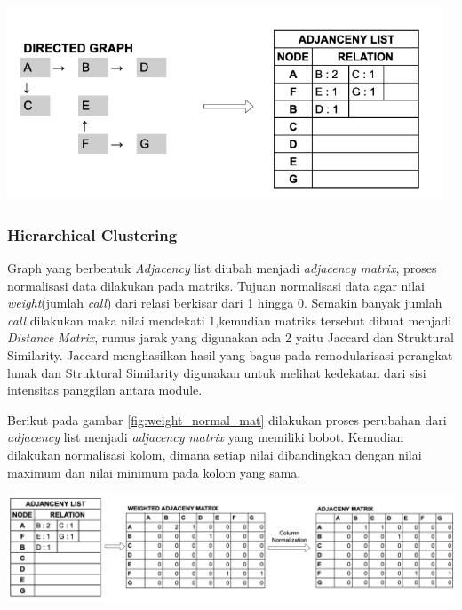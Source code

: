 \begin{center}
	\includegraphics[width=13cm]{img/bab_3/dg_al.png}
	\label{fig:dg_al}
\end{center}

\subsubsection{Hierarchical Clustering}
Graph yang berbentuk \textit{Adjacency} list diubah menjadi \textit{adjacency} \textit{matrix}, proses normalisasi data dilakukan pada matriks. Tujuan normalisasi data agar nilai \textit{weight}(jumlah \textit{call}) dari relasi berkisar dari 1 hingga 0. Semakin banyak jumlah \textit{call} dilakukan maka nilai mendekati 1,kemudian matriks tersebut dibuat menjadi \textit{Distance} \textit{Matrix}, rumus jarak yang digunakan ada 2 yaitu Jaccard dan Struktural Similarity. Jaccard menghasilkan hasil yang bagus pada remodularisasi perangkat lunak dan Struktural Similarity digunakan untuk melihat kedekatan dari sisi intensitas panggilan antara module.

Berikut pada gambar \ref{fig:weight_normal_mat} dilakukan proses perubahan dari \textit{adjacency} list menjadi \textit{adjacency} \textit{matrix} yang memiliki bobot. Kemudian dilakukan normalisasi kolom, dimana setiap nilai dibandingkan dengan nilai maximum dan nilai minimum pada kolom yang sama. 

\begin{center}
	\includegraphics[width=14cm]{img/bab_3/weight_normal_mat.png}
	\label{fig:weight_normal_mat}
\end{center}

